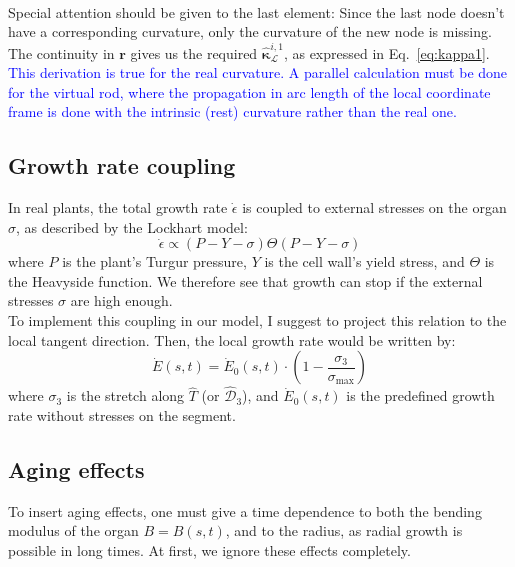 \documentclass[a4paper, 11pt]{article}
\begin{document}
\\
\noindent Special attention should be given to the last element: Since the last node doesn't have a corresponding curvature, only the curvature of the new node is missing.  The continuity in $\boldsymbol{r}$ gives us the required $\hat{\boldsymbol{\kappa}}^{i,1}_\mathcal{L}$, as expressed in Eq.~\ref{eq:kappa1}. \\

\noindent \textcolor{blue}{This derivation is true for the real curvature. A parallel calculation must be done for the virtual rod, where the propagation in arc length of the local coordinate frame is done with the intrinsic (rest) curvature rather than the real one.}




\newpage

\subsection*{Growth rate coupling}
In real plants, the total growth rate $\dot{\epsilon}$ is coupled to external stresses on the organ $\sigma$, as described by the Lockhart model:
\begin{equation}
    \dot{\epsilon}\propto (P-Y-\sigma) \Theta (P-Y-\sigma)
\end{equation}
where $P$ is the plant's Turgur pressure, $Y$ is the cell wall's yield stress, and $\Theta$ is the Heavyside function. 
We therefore see that growth can stop if the external stresses $\sigma$ are high enough. \\
To implement this coupling in our model, I suggest to project this relation to the local tangent direction.  Then, the local growth rate would be written by:
\begin{equation}
    \dot{E}(s,t)=\dot{E}_0(s,t)\cdot\left(1-\frac{\sigma_3}{\sigma_{\text{max}}}\right)
\end{equation}
where $\sigma_3$ is the stretch along $\hat{T}$ (or $\hat{\mathcal{D}}_3$), and $\dot{E}_0(s,t)$ is the predefined growth rate without stresses on the segment.\\
\subsection*{Aging effects}
To insert aging effects, one must give a time dependence to both the bending modulus of the organ $B=B(s,t)$, and to the radius, as radial growth is possible in long times. At first, we ignore these effects completely.
\end{document}
